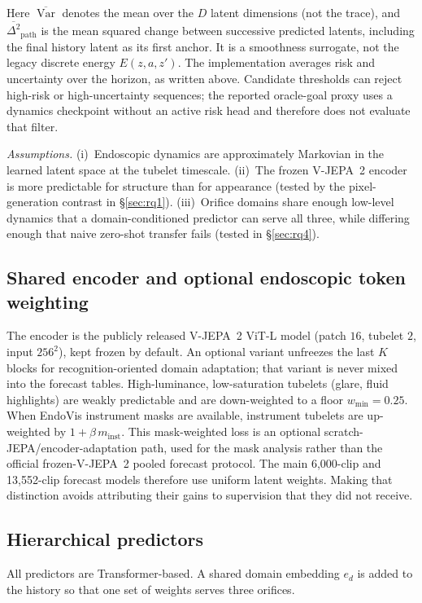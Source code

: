\documentclass[preprint,12pt]{elsarticle}
\begin{document}
Here $\overline{\operatorname{Var}}$ denotes the mean over the $D$ latent
dimensions (not the trace), and
$\overline{\Delta^2}_{\mathrm{path}}$ is the mean squared change between
successive predicted latents, including the final history latent as its first
anchor. It is a smoothness surrogate, not the legacy discrete energy
$E(z,a,z')$. The implementation averages risk and uncertainty over the
horizon, as written above. Candidate thresholds can reject high-risk or
high-uncertainty sequences; the reported oracle-goal proxy uses a dynamics
checkpoint without an active risk head and therefore does not evaluate that
filter.

\emph{Assumptions.}
(i)~Endoscopic dynamics are approximately Markovian in the learned latent space at the tubelet timescale.
(ii)~The frozen V-JEPA~2 encoder is more predictable for structure than for appearance (tested by the pixel-generation contrast in \S\ref{sec:rq1}).
(iii)~Orifice domains share enough low-level dynamics that a domain-conditioned predictor can serve all three, while differing enough that naive zero-shot transfer fails (tested in \S\ref{sec:rq4}).

\subsection{Shared encoder and optional endoscopic token weighting}
The encoder is the publicly released V-JEPA~2 ViT-L model (patch $16$, tubelet
$2$, input $256^2$), kept frozen by default.
An optional variant unfreezes the last $K$ blocks for recognition-oriented domain adaptation; that variant is never mixed into the forecast tables.
High-luminance, low-saturation tubelets (glare, fluid highlights) are weakly predictable and are down-weighted to a floor $w_{\min}{=}0.25$.
When EndoVis instrument masks are available, instrument tubelets are up-weighted by $1+\beta\, m_{\mathrm{inst}}$.
This mask-weighted loss is an optional scratch-JEPA/encoder-adaptation path,
used for the mask analysis rather than the official frozen-V-JEPA~2 pooled
forecast protocol. The main 6,000-clip and 13,552-clip forecast models
therefore use uniform latent weights. Making that distinction avoids
attributing their gains to supervision that they did not receive.

\subsection{Hierarchical predictors}
\label{sec:predictors}
All predictors are Transformer-based.
A shared domain embedding $e_d$ is added to the history so that one set of weights serves three orifices.
\end{document}
